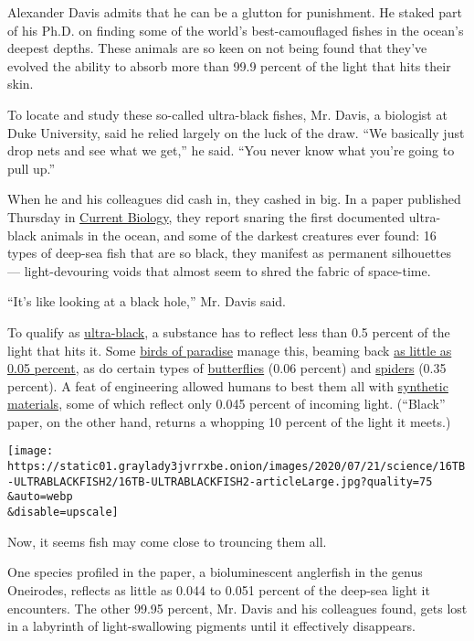 Alexander Davis admits that he can be a glutton for punishment. He
staked part of his Ph.D. on finding some of the world's best-camouflaged
fishes in the ocean's deepest depths. These animals are so keen on not
being found that they've evolved the ability to absorb more than 99.9
percent of the light that hits their skin.

To locate and study these so-called ultra-black fishes, Mr. Davis, a
biologist at Duke University, said he relied largely on the luck of the
draw. ``We basically just drop nets and see what we get,'' he said.
``You never know what you're going to pull up.''

When he and his colleagues did cash in, they cashed in big. In a paper
published Thursday in
\href{http://dx.doi.org/10.1016/j.cub.2020.06.044}{Current Biology},
they report snaring the first documented ultra-black animals in the
ocean, and some of the darkest creatures ever found: 16 types of
deep-sea fish that are so black, they manifest as permanent silhouettes
--- light-devouring voids that almost seem to shred the fabric of
space-time.

``It's like looking at a black hole,'' Mr. Davis said.

To qualify as
\href{https://www.nytimes3xbfgragh.onion/2019/11/11/science/black-fashion-physics-animals.html}{ultra-black},
a substance has to reflect less than 0.5 percent of the light that hits
it. Some
\href{https://cdn.mos.cms.futurecdn.net/qpDcS5xokG7zrWesXcXd8V.jpg}{birds
of paradise} manage this, beaming back
\href{https://www.nature.com/articles/s41467-017-02088-w}{as little as
0.05 percent}, as do certain types of
\href{https://www.nature.com/articles/s41467-020-15033-1}{butterflies}
(0.06 percent) and
\href{https://royalsocietypublishing.org/doi/10.1098/rspb.2019.0589}{spiders}
(0.35 percent). A feat of engineering allowed humans to best them all
with \href{https://www.pnas.org/content/106/15/6044}{synthetic
materials}, some of which reflect only 0.045 percent of incoming light.
(``Black'' paper, on the other hand, returns a whopping 10 percent of
the light it meets.)

\texttt{[image: https://static01.graylady3jvrrxbe.onion/images/2020/07/21/science/16TB-ULTRABLACKFISH2/16TB-ULTRABLACKFISH2-articleLarge.jpg?quality=75\\\&auto=webp\\\&disable=upscale]}

Now, it seems fish may come close to trouncing them all.

One species profiled in the paper, a bioluminescent anglerfish in the
genus Oneirodes, reflects as little as 0.044 to 0.051 percent of the
deep-sea light it encounters. The other 99.95 percent, Mr. Davis and his
colleagues found, gets lost in a labyrinth of light-swallowing pigments
until it effectively disappears.

